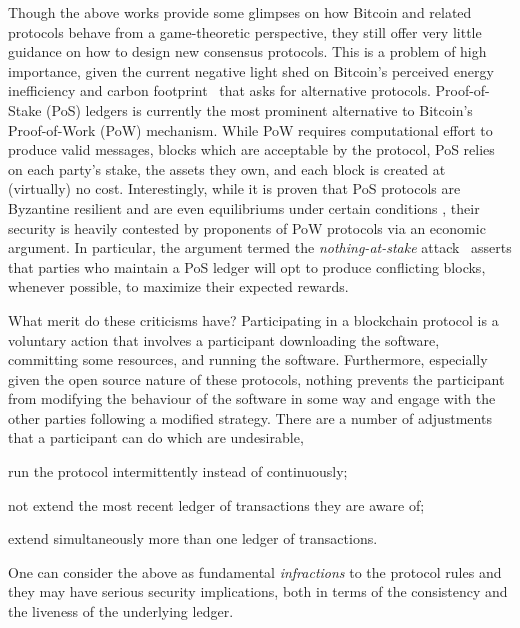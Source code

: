 Though the above works provide some glimpses on how Bitcoin and related
protocols behave from a game-theoretic perspective, they still offer very
little guidance on how to design new consensus protocols. This is a problem of
high importance, given the current negative light shed on Bitcoin's perceived
energy inefficiency and carbon footprint~\cite{martin2021energy} that
asks for alternative protocols. Proof-of-Stake (PoS) ledgers is currently the
most prominent alternative to Bitcoin's Proof-of-Work (PoW) mechanism. While
PoW requires computational effort to produce valid messages, \ie blocks which
are acceptable by the protocol, PoS relies on each party's stake, \ie the
assets they own, and each block is created at (virtually) no cost.
Interestingly, while it is proven that PoS protocols are Byzantine resilient
\cite{C:KRDO17,EPRINT:CGMV18,EPRINT:GHMVZ17,buterin2017casper} and are even
equilibriums under certain conditions \cite{C:KRDO17}, their security is
heavily contested by proponents of PoW protocols via an economic argument. In
particular, the argument termed the \emph{nothing-at-stake}
attack~\cite{li2017securing,ethereumFaq,nothing-at-stake-1} asserts that
parties who maintain a PoS ledger will opt to produce conflicting blocks,
whenever possible, to maximize their expected rewards.

What merit do these criticisms have?  Participating in a blockchain protocol is
a voluntary action that involves a participant downloading the software,
committing some resources, and running the software. Furthermore, especially
given the open source nature of these protocols, nothing prevents the
participant from modifying the behaviour of the software in some way and engage
with the other parties following a modified strategy. There are a number of
adjustments that a participant can do which are undesirable, \eg
\begin{inparaenum}[i)]
    \item run the protocol intermittently instead of continuously;
    \item not extend the most recent ledger of transactions they are aware of;
    \item extend simultaneously more than one ledger of transactions.
\end{inparaenum}
One can consider the above as fundamental {\em infractions} to the protocol
rules and they may have serious security implications, both in terms of the
consistency and the liveness of the underlying ledger.

